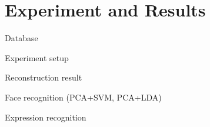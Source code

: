 \chapter{Experiment and Results}

Database

Experiment setup

Reconstruction result

Face recognition (PCA+SVM, PCA+LDA)

Expression recognition